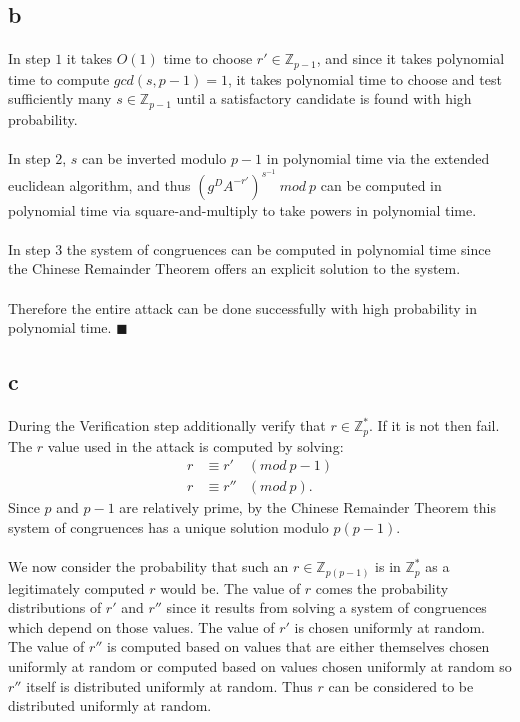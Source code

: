\documentclass[letterpaper,12pt,oneside,onecolumn]{report}
\begin{document}
\subsection*{b}
\paragraph{}
In step $1$ it takes $O(1)$ time to choose $r' \in \mathbb{Z}_{p-1}$, and since it takes polynomial time to compute $gcd(s,p-1) = 1$, it takes polynomial time to choose and test sufficiently many $s \in \mathbb{Z}_{p-1}$ until a satisfactory candidate is found with high probability.
\paragraph{}
In step $2$, $s$ can be inverted modulo $p-1$ in polynomial time via the extended euclidean algorithm, and thus $(g^DA^{-r'})^{s^{-1}}\ mod\ p$ can be computed in polynomial time via square-and-multiply to take powers in polynomial time.
\paragraph{}
In step $3$ the system of congruences can be computed in polynomial time since the Chinese Remainder Theorem offers an explicit solution to the system.
\paragraph{}
Therefore the entire attack can be done successfully with high probability in polynomial time. $\blacksquare$
\subsection*{c}
\paragraph{}
During the Verification step additionally verify that $r \in \mathbb{Z}_p^*$. If it is not then fail. The $r$ value used in the attack is computed by solving:
\begin{align*}
r &\equiv r' &(mod\ p-1)\\
r &\equiv r'' &(mod\ p).
\end{align*}
Since $p$ and $p-1$ are relatively prime, by the Chinese Remainder Theorem this system of congruences has a unique solution modulo $p(p-1)$.
\paragraph{}
We now consider the probability that such an $r \in \mathbb{Z}_{p(p-1)}$ is in $\mathbb{Z}_p^*$ as a legitimately computed $r$ would be. The value of $r$ comes the probability distributions of $r'$ and $r''$ since it results from solving a system of congruences which depend on those values. The value of $r'$ is chosen uniformly at random. The value of $r''$ is computed based on values that are either themselves chosen uniformly at random or computed based on values chosen uniformly at random so $r''$ itself is distributed uniformly at random. Thus $r$ can be considered to be distributed uniformly at random.
\end{document}
